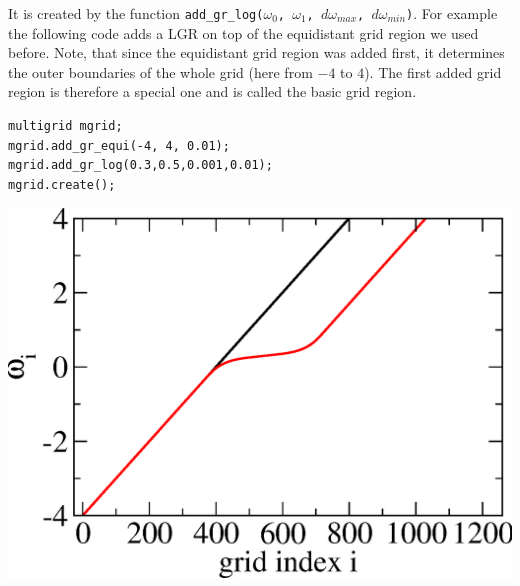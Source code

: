 It is created by the function \texttt{add\_gr\_log($\omega_0$, $\omega_1$, $d\omega_{max}$, $d\omega_{min}$)}. For example the following code adds a LGR on top of the equidistant grid region we used before. Note, that since the equidistant grid region was added first, it determines the outer boundaries of the whole grid (here from $-4$ to $4$). The first added grid region is therefore a special one and is called the basic grid region.
\\
\vspace{1cm}
\noindent\begin{minipage}[l]{0.6\textwidth}
\begin{lstlisting}
multigrid mgrid;
mgrid.add_gr_equi(-4, 4, 0.01);
mgrid.add_gr_log(0.3,0.5,0.001,0.01);
mgrid.create();
\end{lstlisting}
\end{minipage}
\begin{minipage}[]{0.4\textwidth}
	\includegraphics[width=1.0\textwidth]{pics/multigrid_01.eps}
\end{minipage}

